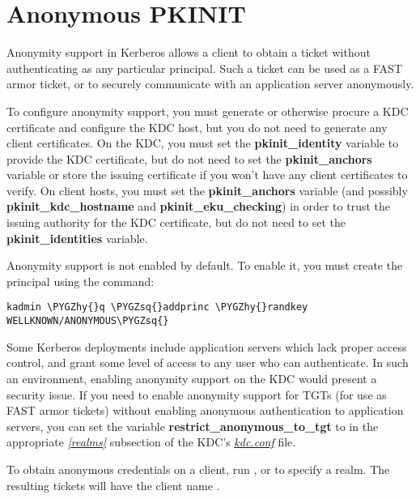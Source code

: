 \documentclass[letterpaper,10pt,english]{sphinxmanual}
\def\PYGZhy{\char`\-}
\def\PYGZsq{\char`\'}
\begin{document}
\section{Anonymous PKINIT}
\label{admin/pkinit:anonymous-pkinit}\label{admin/pkinit:id1}
Anonymity support in Kerberos allows a client to obtain a ticket
without authenticating as any particular principal.  Such a ticket can
be used as a FAST armor ticket, or to securely communicate with an
application server anonymously.

To configure anonymity support, you must generate or otherwise procure
a KDC certificate and configure the KDC host, but you do not need to
generate any client certificates.  On the KDC, you must set the
\textbf{pkinit\_identity} variable to provide the KDC certificate, but do
not need to set the \textbf{pkinit\_anchors} variable or store the issuing
certificate if you won't have any client certificates to verify.  On
client hosts, you must set the \textbf{pkinit\_anchors} variable (and
possibly \textbf{pkinit\_kdc\_hostname} and \textbf{pkinit\_eku\_checking}) in order
to trust the issuing authority for the KDC certificate, but do not
need to set the \textbf{pkinit\_identities} variable.

Anonymity support is not enabled by default.  To enable it, you must
create the principal  using the command:

\begin{Verbatim}[commandchars=\\\{\}]
kadmin \PYGZhy{}q \PYGZsq{}addprinc \PYGZhy{}randkey WELLKNOWN/ANONYMOUS\PYGZsq{}
\end{Verbatim}

Some Kerberos deployments include application servers which lack
proper access control, and grant some level of access to any user who
can authenticate.  In such an environment, enabling anonymity support
on the KDC would present a security issue.  If you need to enable
anonymity support for TGTs (for use as FAST armor tickets) without
enabling anonymous authentication to application servers, you can set
the variable \textbf{restrict\_anonymous\_to\_tgt} to  in the
appropriate {\hyperref[admin/conf_files/kdc_conf:kdc-realms]{\emph{{[}realms{]}}}} subsection of the KDC's
{\hyperref[admin/conf_files/kdc_conf:kdc-conf-5]{\emph{kdc.conf}}} file.

To obtain anonymous credentials on a client, run , or
 to specify a realm.  The resulting tickets
will have the client name .
\end{document}
